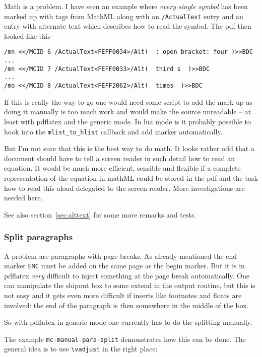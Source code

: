 \documentclass[DIV=12,parskip=half-,bibliography=totoc]{scrartcl}
\begin{document}
Math is a problem. I have seen an example where \emph{every single symbol} has been marked up with tags from MathML along with an \texttt{/ActualText} entry and an entry with alternate text which describes how to read the symbol.
The pdf then looked like this

\begin{lstlisting}
/mn <</MCID 6 /ActualText<FEFF0034>/Alt(  : open bracket: four )>>BDC
...
/mn <</MCID 7 /ActualText<FEFF0033>/Alt(  third s  )>>BDC
...
/mo <</MCID 8 /ActualText<FEFF2062>/Alt(  times  )>>BDC
\end{lstlisting}


If this is really the way to go one would need some script to add the mark-up as doing it manually is too much work and would make the source unreadable -- at least with pdflatex and the generic mode. In lua mode is it probably possible to hook into the \texttt{mlist\_to\_hlist} callback and add marker automatically.

But I'm not sure that this is the best way to do math. It looks rather odd that a document should have to tell a screen reader in such detail how to read an equation. It would be much more efficient, sensible and flexible if a complete representation of the equation in mathML could be stored in the pdf and the task how to read this aloud delegated to the screen reader. More investigations are needed here.

See also section~\ref{sec:alttext} for some more remarks and tests.

\subsubsection{Split paragraphs}\label{sec:splitpara}

A problem are paragraphs with page breaks.  As already mentioned the end marker \texttt{EMC} must be added on the same page as the begin marker. But it is in pdflatex \emph{very} difficult to inject something at the page break automatically. One can manipulate the shipout box to some extend in the output routine, but this is not easy and it gets even more difficult if inserts like footnotes and floats are involved: the end of the paragraph is then somewhere in the middle of the box.

So with pdflatex in generic mode one currently has to do the splitting manually.

The example \texttt{mc-manual-para-split} demonstrates how this can be done. The general idea is to use \verb+\vadjust+ in the right place:
\end{document}
